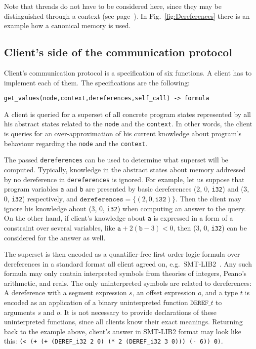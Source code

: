 \documentclass[envcountsame]{llncs}
\newcommand{\tmbraw}[3]{(\ensuremath{#1}, \ensuremath{#2}, \texttt{#3})}
\newcommand{\tmb}[3]{\tmbraw{#1}{#2}{#3}}
\begin{document}
Note that threads do not have to be considered here, since they may be
distinguished through a context (see page~\pageref{sec:Multi-threading}). In
Fig.~\ref{fig:Dereferences} there is an example how a canonical memory is used.


\subsection{Client's side of the communication protocol}
\label{sec:ClientProtocol}

Client's communication protocol is a specification of six functions. A client
has to  implement each of them. The specifications are the following: \newline

\noindent\texttt{get\_values(node,context,dereferences,self\_call) -> formula}

A client is queried for a superset of all concrete program states represented
by all his abstract states related to the \texttt{node} and the
\texttt{context}. In other words, the client is queries for an
over-approximation of his current knowledge about program's behaviour regarding
the \texttt{node} and the \texttt{context}.

The passed \texttt{dereferences} can be used to determine what superset will be
computed. Typically, knowledge in the abstract states about memory addressed by
no dereference in \texttt{dereferences} is ignored.
For example, let us suppose that program variables \texttt{a} and \texttt{b} are
presented by basic dereferences \tmb{2}{0}{i32} and \tmb{3}{0}{i32}
respectively, and $ \texttt{dereferences} = \{ \tmb{2}{0}{i32} \} $. Then the
client may ignore his knowledge about \tmb{3}{0}{i32} when computing an answer
to the query. On the other hand, if client's knowledge about \texttt{a} is
expressed in a form of a constraint over several variables, like $ \texttt{a} +
2(\texttt{b} - 3) < 0 $, then \tmb{3}{0}{i32} can be considered for the answer
as well.

\newcommand{\deref}[3]{\texttt{(DEREF\_#3 #1 #2)}}

The superset is then encoded as a quantifier-free first order logic formula over
dereferences in a standard format all client agreed on,
e.g.~SMT-LIB2~\cite{SMTLIBURL}. Any such formula may only contain interpreted
symbols from theories of integers, Peano's arithmetic, and reals. The only
uninterpreted symbols are related to dereferences: A dereference with a segment
expression $ s $, an offset expression $ o $, and a type $ t $ is encoded as an
application of a binary uninterpreted function $ \texttt{DEREF\_}t $ to
arguments $ s $ and $ o $. It is not necessary to provide declarations of these
uninterpreted functions, since all clients know their exact meanings. Returning back to the example above, client's answer in SMT-LIB2 format may look
like this: \texttt{(< (+ (+ \deref{2}{0}{i32} (* 2 \deref{3}{0}{i32})) (- 6))
0)}.
\end{document}
